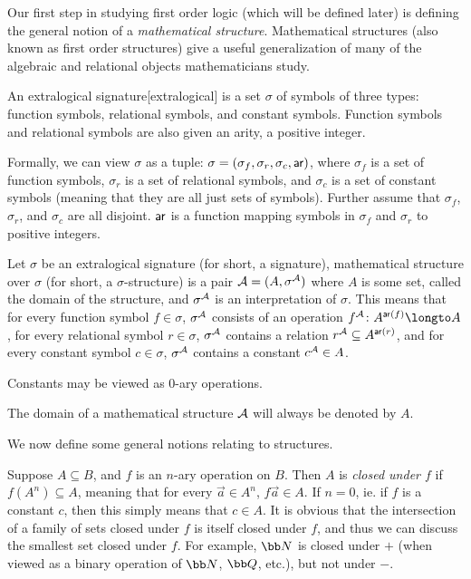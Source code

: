 Our first step in studying first order logic (which will be defined later) is defining the general notion of a {\it mathematical structure}.
Mathematical structures (also known as first order structures) give a useful generalization of many of the algebraic and relational objects mathematicians study.

\bdefn

    An {\emphcolor extralogical signature}[extralogical] is a set $\sigma$ of symbols of three types: function symbols, relational symbols, and constant symbols.
    Function symbols and relational symbols are also given an {\emphcolor arity}, a positive integer.

    Formally, we can view $\sigma$ as a tuple: $\sigma=(\sigma_f,\sigma_r,\sigma_c,{\sf ar})$, where $\sigma_f$ is a set of function symbols, $\sigma_r$ is a set of relational symbols, and $\sigma_c$ is a
    set of constant symbols (meaning that they are all just sets of symbols).
    Further assume that $\sigma_f$, $\sigma_r$, and $\sigma_c$ are all disjoint.
    ${\sf ar}$ is a function mapping symbols in $\sigma_f$ and $\sigma_r$ to positive integers.

\edefn

\bdefn

    Let $\sigma$ be an extralogical signature (for short, a signature), {\emphcolor mathematical structure} over $\sigma$ (for short, a $\sigma$-structure) is a pair
    ${\cal A}=(A,\sigma^{\cal A})$ where $A$ is some set, called the {\emphcolor domain} of the structure, and $\sigma^{\cal A}$ is an {\emphcolor interpretation} of $\sigma$.
    This means that for every function symbol $f\in\sigma$, $\sigma^{\cal A}$ consists of an operation $f^{\cal A}\colon A^{{\sf ar}(f)}\longto A$, for every relational symbol $r\in\sigma$, $\sigma^{\cal A}$
    contains a relation $r^{\cal A}\subseteq A^{{\sf ar}(r)}$, and for every constant symbol $c\in\sigma$, $\sigma^{\cal A}$ contains a constant $c^{\cal A}\in A$.

    Constants may be viewed as $0$-ary operations.

    The domain of a mathematical structure ${\cal A}$ will always be denoted by $A$.

\edefn

We now define some general notions relating to structures.

Suppose $A\subseteq B$, and $f$ is an $n$-ary operation on $B$.
Then $A$ is {\it closed under $f$} if $f(A^n)\subseteq A$, meaning that for every $\vec a\in A^n$, $f\vec a\in A$.
If $n=0$, ie. if $f$ is a constant $c$, then this simply means that $c\in A$.
It is obvious that the intersection of a family of sets closed under $f$ is itself closed under $f$, and thus we can discuss the smallest set closed under $f$.
For example, ${\bb N}$ is closed under $+$ (when viewed as a binary operation of ${\bb N}$, ${\bb Q}$, etc.), but not under $-$.

